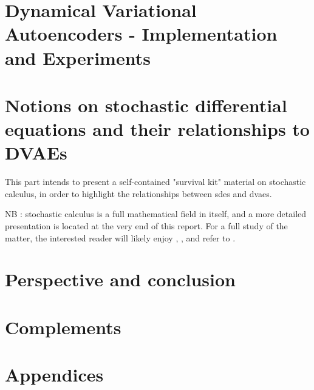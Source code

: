 \documentclass[twoside,11pt]{report}
\begin{document}
    
    
    
    
    

\part{Dynamical Variational Autoencoders - Implementation and Experiments}

    

% 
%
%
%

\part{Notions on stochastic differential equations and their relationships to DVAEs}

This part intends to present a self-contained "survival kit" material on stochastic calculus, in order to highlight the relationships between \glspl{sde} and \glspl{dvae}.

NB : stochastic calculus is a full mathematical field in itself, and a more detailed presentation is located at the very end of this report. For a full study
of the matter, the interested reader will likely enjoy \cite{mouvement-brownien-calcul-ito}, \cite{sarkka_applied_2019}, and refer to \cite{cours-jf-legall}.

    
    
    

\part{Perspective and conclusion}

    
    

%
%
%
%

\part{Complements}

    
    
    
    

%
%
%
%

\part{Appendices}

\begin{appendices}
    
\end{appendices}

\printglossary


\nocite{*}
\printbibliography
\end{document}
